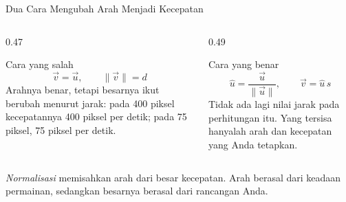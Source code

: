 \documentclass[aspectratio=169,10pt]{beamer}
\begin{document}
\begin{frame}{Dua Cara Mengubah Arah Menjadi Kecepatan}
\begin{columns}[T,onlytextwidth]
  \begin{column}{0.47\textwidth}
    \begin{block}{Cara yang salah}
      \[
        \vec{v} = \vec{u},
        \qquad \lVert \vec{v} \rVert = d
      \]
      {\scriptsize Arahnya benar, tetapi besarnya ikut berubah menurut jarak:
       pada 400 piksel kecepatannya 400 piksel per detik; pada 75 piksel,
       75 piksel per detik.}
    \end{block}
  \end{column}
  \begin{column}{0.49\textwidth}
    \begin{exampleblock}{Cara yang benar}
      \[
        \hat{u} = \frac{\vec{u}}{\lVert \vec{u} \rVert},
        \qquad \vec{v} = \hat{u}\, s
      \]
      {\scriptsize Tidak ada lagi nilai jarak pada perhitungan itu. Yang
       tersisa hanyalah arah dan kecepatan yang Anda tetapkan.}
    \end{exampleblock}
  \end{column}
\end{columns}
\vspace{0.10cm}
\begin{kotak}
\emph{Normalisasi} memisahkan arah dari besar kecepatan. Arah berasal dari
keadaan permainan, sedangkan besarnya berasal dari rancangan Anda.
\end{kotak}
\end{frame}
\end{document}
